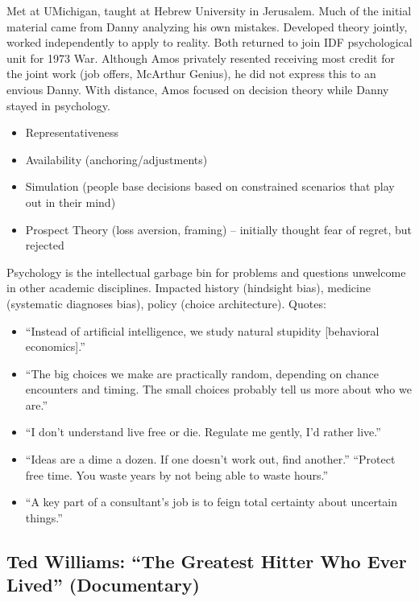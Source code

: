 \documentclass[
]{article}
\begin{document}
Met at UMichigan, taught at Hebrew University in Jerusalem. Much of the
initial material came from Danny analyzing his own mistakes. Developed
theory jointly, worked independently to apply to reality. Both returned
to join IDF psychological unit for 1973 War. Although Amos privately
resented receiving most credit for the joint work (job offers, McArthur
Genius), he did not express this to an envious Danny. With distance,
Amos focused on decision theory while Danny stayed in psychology.

\begin{itemize}
\item
  Representativeness
\item
  Availability (anchoring/adjustments)
\item
  Simulation (people base decisions based on constrained scenarios that
  play out in their mind)
\item
  Prospect Theory (loss aversion, framing) -- initially thought fear of
  regret, but rejected
\end{itemize}

Psychology is the intellectual garbage bin for problems and questions
unwelcome in other academic disciplines. Impacted history (hindsight
bias), medicine (systematic diagnoses bias), policy (choice
architecture). Quotes:

\begin{itemize}
\item
  ``Instead of artificial intelligence, we study natural stupidity
  {[}behavioral economics{]}.''
\item
  ``The big choices we make are practically random, depending on chance
  encounters and timing. The small choices probably tell us more about
  who we are.''
\item
  ``I don't understand live free or die. Regulate me gently, I'd rather
  live.''
\item
  ``Ideas are a dime a dozen. If one doesn't work out, find another.''
  ``Protect free time. You waste years by not being able to waste
  hours.''
\item
  ``A key part of a consultant's job is to feign total certainty about
  uncertain things.''
\end{itemize}

\hypertarget{ted-williams-the-greatest-hitter-who-ever-lived-documentary}{%
\subsection{Ted Williams: ``The Greatest Hitter Who Ever Lived''
(Documentary)}\label{ted-williams-the-greatest-hitter-who-ever-lived-documentary}}
\end{document}
